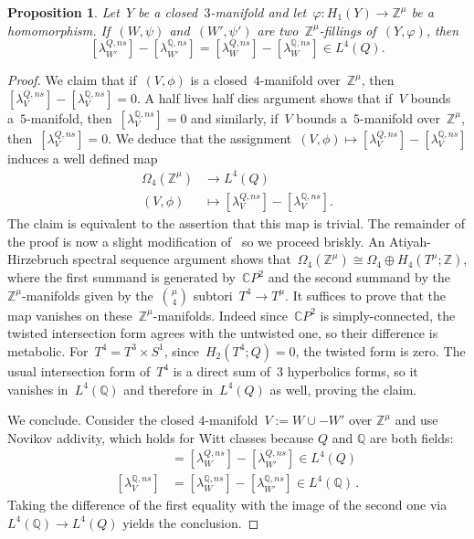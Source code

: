 \documentclass[10.9pt,a4paper]{amsart}
\newtheorem{proposition}[theorem]{Proposition}
\theoremstyle{definition}
\theoremstyle{remark}
\newcommand{\Z}{\mathbb{Z}}
\newcommand{\Q}{\mathbb{Q}}
\newcommand{\C}{\mathbb{C}}
\begin{document}
\begin{proposition}
\label{prop:WellDef}
Let~$Y$ be a closed~$3$-manifold and let~$\varphi \colon H_1(Y) \to \Z^\mu$ be a homomorphism.
If~$(W,\psi)$ and~$(W',\psi')$ are two~$\Z^\mu$-fillings of~$(Y,\varphi)$, then 
$$ 
[\lambda_{W'}^{Q,\textit{ns}}]-[\lambda_{W'}^{\Q,\textit{ns}}]
=
[\lambda_W^{Q,\textit{ns}}]-[\lambda_W^{\Q,\textit{ns}}]
\in L^4(Q).
$$
\end{proposition}
\begin{proof}
We claim that if~$(V,\phi)$ is a closed~$4$-manifold over~$\Z^\mu$, then~$[\lambda_V^{Q,\textit{ns}}]-[\lambda_V^{\Q,\textit{ns}}]=0$. 
A half lives half dies argument shows that if~$V$ bounds a~$5$-manifold, then~$[\lambda_V^{\Q,\textit{ns}}]=0$ and similarly,   if~$V$ 
bounds a~$5$-manifold over~$\Z^\mu$, then~$[\lambda_V^{Q,\textit{ns}}]=0$.
We deduce that the assignment~$(V,\phi) \mapsto [\lambda_V^{Q,\textit{ns}}]-[\lambda_V^{\Q,\textit{ns}}]$ induces a well defined map
\begin{align*}
 \Omega_4(\Z^\mu) &\to L^4(Q) \\
(V,\phi) &\mapsto [\lambda_V^{Q,\textit{ns}}]-[\lambda_V^{\Q,\textit{ns}}].
\end{align*}
The claim is equivalent to the assertion that this map is trivial.
The remainder of the proof is now a slight modification of~\cite[Proposition 2.10]{ConwayNagelToffoli} so we proceed briskly. 
An Atiyah-Hirzebruch spectral sequence argument shows that~$\Omega_4(\Z^\mu) \cong \Omega_4 \oplus H_4(T^\mu;\Z)$, where the first summand is generated by~$\C P^2$ and the second summand by the $\Z^\mu$-manifolds given by the~${\mu}\choose{4}$ subtori~$T^4 \to T^\mu$.
It suffices to prove that the map vanishes on these~$\Z^\mu$-manifolds. 
Indeed since~$\C P^2$ is simply-connected, the twisted intersection form agrees with the untwisted one, so their difference is metabolic.
For~$T^4=T^3 \times S^1$, since~$H_2(T^4;Q)=0$,  the twisted form is zero.
The usual intersection form of~$T^4$ is a direct sum of~$3$ hyperbolics forms, so it vanishes in~$L^4(\Q)$ and therefore in~$L^4(Q)$ as well,  proving the claim.

We conclude.
Consider the closed $4$-manifold~$V:=W \cup -W'$ over $\Z^\mu$ and use Novikov addivity, which holds for Witt classes because $Q$ and $\Q$ are both fields:
\begin{align*}
[\lambda_V^{Q,\textit{ns}}]&=[\lambda_{W}^{Q,\textit{ns}}]-[\lambda_{W'}^{Q,\textit{ns}}] \in L^4(Q)  \\
[\lambda_V^{\Q,\textit{ns}}]&=[\lambda_{W}^{\Q,\textit{ns}}]-[\lambda_{W'}^{\Q,\textit{ns}}]  \in L^4(\Q)\,.
\end{align*}
Taking the difference of the first equality with the image of the second one via~$L^4(\Q)\to L^4(Q)$ yields the conclusion.
\end{proof}
\end{document}
